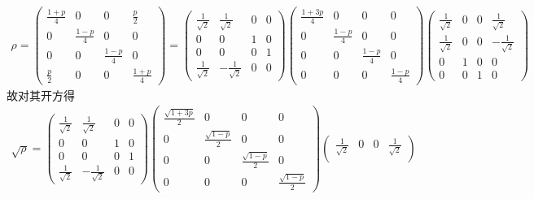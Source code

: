 \documentclass{assignment}
\begin{document}
\begin{sol}
\begin{align}
        \rho=\begin{pmatrix}
            \frac{1+p}{4}&0&0&\frac{p}{2}\\
            0&\frac{1-p}{4}&0&0\\
            0&0&\frac{1-p}{4}&0\\
            \frac{p}{2}&0&0&\frac{1+p}{4}
        \end{pmatrix}=\begin{pmatrix}
            \frac{1}{\sqrt{2}}&\frac{1}{\sqrt{2}}&0&0\\
            0&0&1&0\\
            0&0&0&1\\
            \frac{1}{\sqrt{2}}&-\frac{1}{\sqrt{2}}&0&0
        \end{pmatrix}\begin{pmatrix}
            \frac{1+3p}{4}&0&0&0\\
            0&\frac{1-p}{4}&0&0\\
            0&0&\frac{1-p}{4}&0\\
            0&0&0&\frac{1-p}{4}
        \end{pmatrix}\begin{pmatrix}
            \frac{1}{\sqrt{2}}&0&0&\frac{1}{\sqrt{2}}\\
            \frac{1}{\sqrt{2}}&0&0&-\frac{1}{\sqrt{2}}\\
            0&1&0&0\\
            0&0&1&0
        \end{pmatrix}
    \end{align}
    故对其开方得
    \begin{align}
        \sqrt{\rho}=\begin{pmatrix}
            \frac{1}{\sqrt{2}}&\frac{1}{\sqrt{2}}&0&0\\
            0&0&1&0\\
            0&0&0&1\\
            \frac{1}{\sqrt{2}}&-\frac{1}{\sqrt{2}}&0&0
        \end{pmatrix}\begin{pmatrix}
            \frac{\sqrt{1+3p}}{2}&0&0&0\\
            0&\frac{\sqrt{1-p}}{2}&0&0\\
            0&0&\frac{\sqrt{1-p}}{2}&0\\
            0&0&0&\frac{\sqrt{1-p}}{2}
        \end{pmatrix}\begin{pmatrix}
            \frac{1}{\sqrt{2}}&0&0&\frac{1}{\sqrt{2}}\\

\end{pmatrix}
\end{align}
\end{sol}
\end{document}
